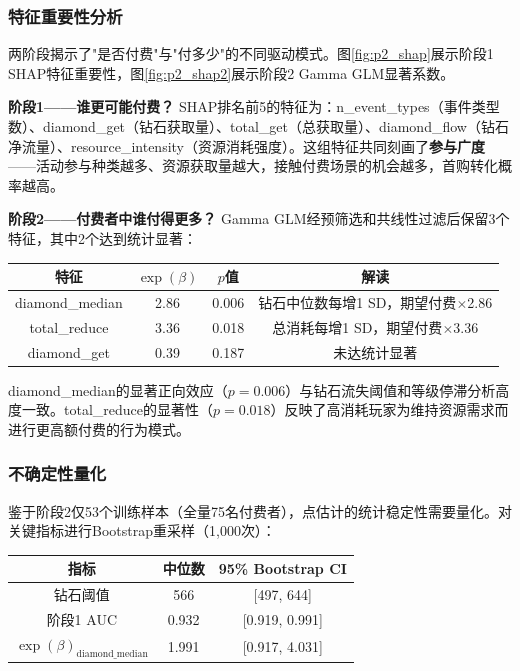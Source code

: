 \subsubsection{特征重要性分析}

两阶段揭示了"是否付费"与"付多少"的不同驱动模式。图\ref{fig:p2_shap}展示阶段1 SHAP\cite{lundberg2017}特征重要性，图\ref{fig:p2_shap2}展示阶段2 Gamma GLM显著系数。

\textbf{阶段1——谁更可能付费？} SHAP排名前5的特征为：n\_event\_types（事件类型数）、diamond\_get（钻石获取量）、total\_get（总获取量）、diamond\_flow（钻石净流量）、resource\_intensity（资源消耗强度）。这组特征共同刻画了\textbf{参与广度}——活动参与种类越多、资源获取量越大，接触付费场景的机会越多，首购转化概率越高。

\textbf{阶段2——付费者中谁付得更多？} Gamma GLM经预筛选和共线性过滤后保留3个特征，其中2个达到统计显著：

\begin{center}
\begin{tabular}{c|c|c|c}
\toprule
\textbf{特征} & $\exp(\beta)$ & \textbf{$p$值} & \textbf{解读} \\
\midrule
diamond\_median & 2.86 & 0.006 & 钻石中位数每增1 SD，期望付费$\times$2.86 \\
total\_reduce & 3.36 & 0.018 & 总消耗每增1 SD，期望付费$\times$3.36 \\
diamond\_get & 0.39 & 0.187 & 未达统计显著 \\
\bottomrule
\end{tabular}
\end{center}

diamond\_median的显著正向效应（$p=0.006$）与钻石流失阈值和等级停滞分析高度一致。total\_reduce的显著性（$p=0.018$）反映了高消耗玩家为维持资源需求而进行更高额付费的行为模式。

\subsubsection{不确定性量化}

鉴于阶段2仅53个训练样本（全量75名付费者），点估计的统计稳定性需要量化。对关键指标进行Bootstrap重采样（1,000次）：

\begin{center}
\begin{tabular}{c|c|c}
\toprule
\textbf{指标} & \textbf{中位数} & \textbf{95\% Bootstrap CI} \\
\midrule
钻石阈值 & 566 & [497, 644] \\
阶段1 AUC & 0.932 & [0.919, 0.991] \\
$\exp(\beta)_{\text{diamond\_median}}$ & 1.991 & [0.917, 4.031] \\
\bottomrule
\end{tabular}
\end{center}

